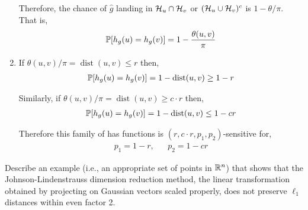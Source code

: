 \documentclass[10pt]{article}
\newcommand{\dist}{\operatorname{dist}}
\begin{document}
\begin{solution}[Solution]
\begin{enumerate}[label=(\alph*)]
        Therefore, the chance of \( \hat{g} \) landing in \( \mathcal{H}_u\cap\mathcal{H}_v \) or \( (\mathcal{H}_u\cup\mathcal{H}_v)^c \) is \( 1-\theta/\pi \). That is,
        \begin{align*}
            \mathbb{P}[h_g(u) = h_g(v)] = 1-\frac{\theta(u,v)}{\pi} 
        \end{align*}
        

        \iffalse
        To show this more rigorously, we let \( \phi(x) \) denote the angle from \( u \) to \( x \) in the clockwise direction (relative to a fixed normal vector of the hyperplane). Then \( \cH_u = \{x\in\cH : \phi(x) \in [-\pi/2,\pi/2] \} \) and \( \cH_v = \{x\in\cH : \phi(x) \in [\phi(v)-\pi/2,\phi(v)+\pi/2 ] \} \).

        Therefore,
        \begin{align*}
            \cH_u\cap\cH_v = \{x\in\cH : \phi(x) \in [\phi(v) - \pi/2 , \pi/2 \] \} 
        \end{align*}
        \fi

    \item 
        If \( \theta(u,v)/\pi = \dist(u,v) \leq r \) then,
        \begin{align*}
            \PP[ h_g(u) = h_g(v) ] = 1 - \dist(u,v) \geq 1 - r
        \end{align*}

        Similarly, if \( \theta(u,v)/\pi = \dist(u,v)\geq c\cdot r \) then,
        \begin{align*}
            \PP[ h_g(u) = h_g(v) ] = 1 - \dist(u,v) \leq 1 - cr
        \end{align*}
        
        Therefore this family of has functions is \( (r,c\cdot r,p_1,p_2) \)-sensitive for,
        \begin{align*}
            p_1 = 1 - r , && p_2 = 1 - cr
        \end{align*}

\end{enumerate}
\end{solution}


\begin{problem}[Problem 4]
    Describe an example (i.e., an appropriate set of points in \(\mathbb{R}^n\)) that shows that the Johnson-Lindenstrauss dimension reduction method, the linear transformation obtained by projecting on Gaussian vectors scaled properly, does not preserve \( \ell_1 \) distances within even factor 2.
\end{problem}
\end{document}
